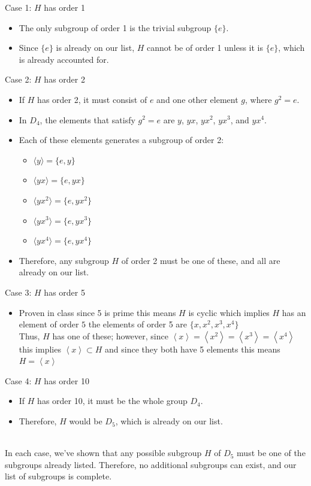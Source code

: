 \documentclass[12pt, letterpaper]{article}
\theoremstyle{definition}
\newcommand{\ang}[1]{\left\langle #1 \right\rangle}
\begin{document}
Case 1: \(H\) has order 1
\begin{itemize}
    \item The only subgroup of order 1 is the trivial subgroup \( \{e\} \).
    \item Since \( \{e\} \) is already on our list, \( H \) cannot be of order 1 unless it is \( \{e\} \), which is already accounted for.
\end{itemize}

Case 2: \(H\) has order 2
\begin{itemize}
    \item If \( H \) has order 2, it must consist of \( e \) and one other element \( g \), where \( g^2 = e \).
    \item In \( D_4 \), the elements that satisfy \( g^2 = e \) are \( y \), \( yx \), \( yx^2 \), \( yx^3 \), and \( yx^4 \).
    \item Each of these elements generates a subgroup of order 2:
    \begin{itemize}
        \item \( \langle y \rangle = \{ e, y \} \)
        \item \( \langle yx \rangle = \{ e, yx \} \)
        \item \( \langle yx^2 \rangle = \{ e, yx^2 \} \)
        \item \( \langle yx^3 \rangle = \{ e, yx^3 \} \)
        \item \( \langle yx^4 \rangle = \{ e, yx^4 \} \)
    \end{itemize}
    \item Therefore, any subgroup \( H \) of order 2 must be one of these, and all are already on our list.
\end{itemize}

Case 3: \(H\) has order 5
\begin{itemize}
    \item Proven in class since 5 is prime this means $H$ is cyclic which implies $H$ has an element of order $5$ the elements of order 5 are $\{x,x^2,x^3,x^4\}$\\
    Thus, $H$ has one of these; however, since $\ang{x}=\ang{x^2}=\ang{x^3}=\ang{x^4}$ this implies $\ang{x} \subset H$ and since they both have 5 elements this means $H=\ang{x}$
\end{itemize}

Case 4: \(H\) has order 10
\begin{itemize}
    \item If \( H \) has order 10, it must be the whole group \( D_4 \).
    \item Therefore, \( H \) would be \( D_5 \), which is already on our list.
\end{itemize}
\phantom{text}\\
In each case, we’ve shown that any possible subgroup \( H \) of \( D_5 \) must be one of the subgroups already listed. Therefore, no additional subgroups can exist, and our list of subgroups is complete.
\end{document}
